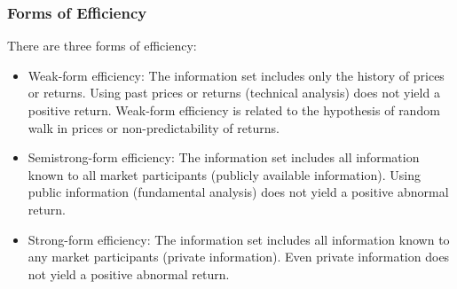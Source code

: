 \documentclass[xcolor=dvipsnames, english, 8pt]{beamer}
\begin{document}
\begin{frame}
    \frametitle{Forms of Efficiency}
There are three forms of efficiency: \vspace{0.25cm}\\
\begin{itemize}
\item {\color{ubRed}Weak-form efficiency}: The information set includes only the history of prices or
returns. Using past prices or returns ({\color{ubRed}technical analysis}) does not yield a positive
return. Weak-form efficiency is related to the hypothesis of random walk in prices or
non-predictability of returns.
\item {\color{ubRed}Semistrong-form efficiency}: The information set includes all information known
to all market participants ({\color{ubRed}publicly available information}). Using public information
(fundamental analysis) does not yield a positive abnormal return.
\item {\color{ubRed}Strong-form efficiency}: The information set includes all information known to any
market participants ({\color{ubRed}private information}). Even private information does not yield a
positive abnormal return.
\end{itemize}
\end{frame}
\end{document}
